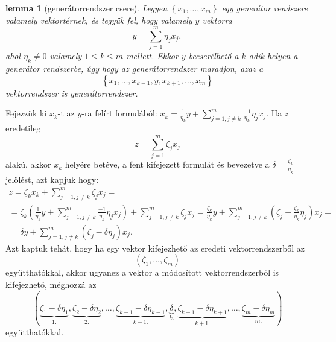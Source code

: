 \documentclass[9pt, showtrims]{memoir}
\makeatletter
\renewenvironment{proof}[1][\proofname]
    {\par\pushQED{\qed}%
    \normalfont \topsep6\p@\@plus6\p@\relax
    \trivlist
    \item[\hskip\labelsep
        \itshape
    #1\@addpunct{:}]\ignorespaces}
    {\popQED\endtrivlist\@endpefalse}
\theoremstyle{plain}
\newtheorem{lemma}[proposition]{lemma}
\theoremstyle{remark}
\theoremstyle{definition}
\makeatother
\begin{document}
\begin{lemma}[generátorrendszer csere]
    Legyen $\left\{ x_1,\dots,x_m \right\}$ egy generátor rendszere valamely vektortérnek,
    és tegyük fel, hogy valamely $y$ vektorra
    \[
        y=\sum_{j=1}^m\eta_jx_j,
    \]
    ahol $\eta_k\neq 0$ valamely $1\leq k\leq m$ mellett. 
    Ekkor $y$ becserélhető a $k$-adik helyen a generátor rendszerbe, 
    úgy hogy az generátorrendszer maradjon, azaz a
    \[
        \left\{ x_1,\dots,x_{k-1},y,x_{k+1},\dots,x_m \right\}
    \]
    vektorrendszer is generátorrendszer.
    \label{le:gencsere}
\end{lemma}
\begin{proof}
    Fejezzük ki $x_k$-t az $y$-ra felírt formulából:
    \(
    x_k=\frac{1}{\eta_k}y+\sum_{j=1,j\neq k}^m\frac{-1}{\eta_k}\eta_jx_j.
    \)
    Ha $z$ eredetileg 
    \[
        z=\sum_{j=1}^m\zeta_jx_j
    \]
    alakú, akkor $x_k$ helyére betéve, a fent kifejezett formulát és bevezetve a 
    $\delta=\frac{\zeta_k}{\eta_k}$ jelölést, azt kapjuk hogy:
    \begin{multline*}
        z=\zeta_kx_k+\sum_{j=1,j\neq k}^m\zeta_jx_j=
        \\
        =
        \zeta_k
        \left( 
        \frac{1}{\eta_k}y+\sum_{j=1,j\neq k}^m\frac{-1}{\eta_k}\eta_jx_j
        \right)
        +\sum_{j=1,j\neq k}^m\zeta_jx_j
        =
        \frac{\zeta_k}{\eta_k}y+
        \sum_{j=1,j\neq k}^m\left( \zeta_j-\frac{\zeta_k}{\eta_k}\eta_j \right)x_j=
        \\
        =\delta y+
        \sum_{j=1,j\neq k}^m\left( \zeta_j-\delta\eta_j \right)x_j.
    \end{multline*}
    Azt kaptuk tehát, hogy ha egy vektor kifejezhető az eredeti vektorrendszerből az 
    \[
        \left( \zeta_1,\dots,\zeta_m \right) 
    \]
    együtthatókkal, akkor ugyanez a vektor a módosított vektorrendszerből is kifejezhető,
    méghozzá az 
    \[
        \left( 
        \underbrace{\zeta_1-\delta\eta_1}_{1.},
        \underbrace{\zeta_2-\delta\eta_2}_{2.},
        \dots,
        \underbrace{\zeta_{k-1}-\delta\eta_{k-1}}_{k-1.},
        \underbrace{\delta}_{k.},
        \underbrace{\zeta_{k+1}-\delta\eta_{k+1}}_{k+1.},\dots,
        \underbrace{\zeta_m-\delta\eta_m}_{m.}
        \right)
    \]
    együtthatókkal.
\end{proof}
\end{document}
